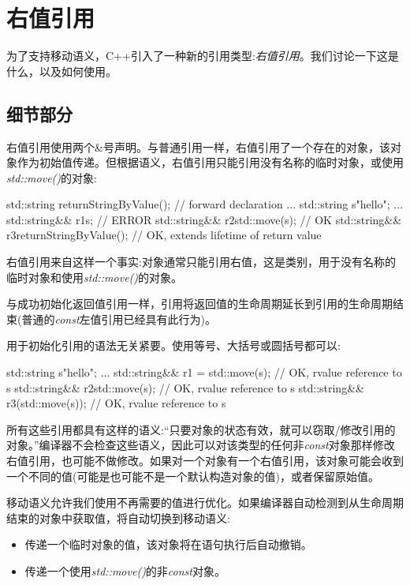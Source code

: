 \section{右值引用}

为了支持移动语义，C++引入了一种新的引用类型:\textit{右值引用}。我们讨论一下这是什么，以及如何使用。

\subsection{细节部分}

右值引用使用两个\&号声明。与普通引用一样，右值引用了一个存在的对象，该对象作为初始值传递。但根据语义，右值引用只能引用没有名称的临时对象，或使用\textit{std::move()}的对象:

\begin{cppcode}
std::string returnStringByValue(); // forward declaration
...
std::string s{"hello"};
...
std::string&& r1{s}; // ERROR
std::string&& r2{std::move(s)}; // OK
std::string&& r3{returnStringByValue()}; // OK, extends lifetime of return value
\end{cppcode}

右值引用来自这样一个事实:对象通常只能引用右值，这是类别，用于没有名称的临时对象和使用\textit{std::move()}的对象。

与成功初始化返回值引用一样，引用将返回值的生命周期延长到引用的生命周期结束(普通的\textit{const}左值引用已经具有此行为)。

用于初始化引用的语法无关紧要。使用等号、大括号或圆括号都可以:

\begin{cppcode}
std::string s{"hello"};
...
std::string&& r1 = std::move(s); // OK, rvalue reference to s
std::string&& r2{std::move(s)}; // OK, rvalue reference to s
std::string&& r3(std::move(s)); // OK, rvalue reference to s
\end{cppcode}

所有这些引用都具有这样的语义:“只要对象的状态有效，就可以窃取/修改引用的对象。”编译器不会检查这些语义，因此可以对该类型的任何非\textit{const}对象那样修改右值引用，也可能不做修改。如果对一个对象有一个右值引用，该对象可能会收到一个不同的值(可能是也可能不是一个默认构造对象的值)，或者保留原始值。

移动语义允许我们使用不再需要的值进行优化。如果编译器自动检测到从生命周期结束的对象中获取值，将自动切换到移动语义:

\begin{itemize}
	\item 传递一个临时对象的值，该对象将在语句执行后自动撤销。
	\item 传递一个使用\textit{std::move()}的非\textit{const}对象。
\end{itemize}

